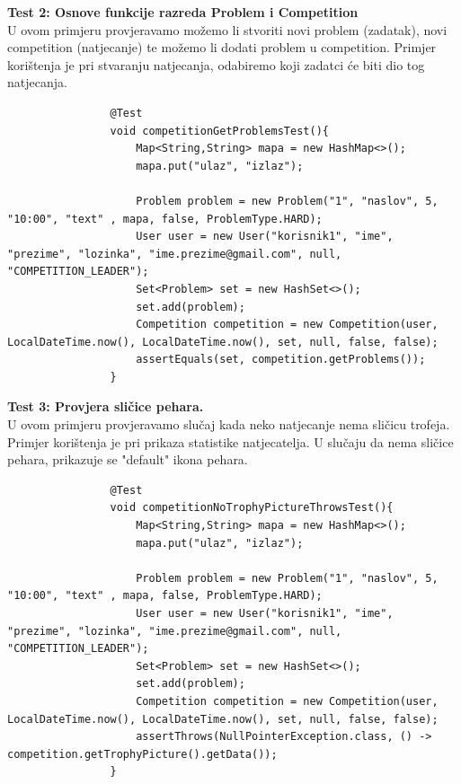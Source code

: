 			\textbf{Test 2: Osnove funkcije razreda Problem i Competition}\\
			U ovom primjeru provjeravamo možemo li stvoriti novi problem (zadatak), novi competition (natjecanje) te možemo li dodati problem u competition. Primjer korištenja je pri stvaranju natjecanja, odabiremo koji zadatci će biti dio tog natjecanja.
			\begin{lstlisting}
				@Test
				void competitionGetProblemsTest(){
					Map<String,String> mapa = new HashMap<>();
					mapa.put("ulaz", "izlaz");
					
					Problem problem = new Problem("1", "naslov", 5, "10:00", "text" , mapa, false, ProblemType.HARD);
					User user = new User("korisnik1", "ime", "prezime", "lozinka", "ime.prezime@gmail.com", null, "COMPETITION_LEADER");
					Set<Problem> set = new HashSet<>();
					set.add(problem);
					Competition competition = new Competition(user, LocalDateTime.now(), LocalDateTime.now(), set, null, false, false);
					assertEquals(set, competition.getProblems());
				}
			\end{lstlisting}
			
			\textbf{Test 3: Provjera sličice pehara.}\\
			U ovom primjeru provjeravamo slučaj kada neko natjecanje nema sličicu trofeja. Primjer korištenja je pri prikaza statistike natjecatelja. U slučaju da nema sličice pehara, prikazuje se "default" ikona pehara.
			\begin{lstlisting}
				@Test
				void competitionNoTrophyPictureThrowsTest(){
					Map<String,String> mapa = new HashMap<>();
					mapa.put("ulaz", "izlaz");
					
					Problem problem = new Problem("1", "naslov", 5, "10:00", "text" , mapa, false, ProblemType.HARD);
					User user = new User("korisnik1", "ime", "prezime", "lozinka", "ime.prezime@gmail.com", null, "COMPETITION_LEADER");
					Set<Problem> set = new HashSet<>();
					set.add(problem);
					Competition competition = new Competition(user, LocalDateTime.now(), LocalDateTime.now(), set, null, false, false);
					assertThrows(NullPointerException.class, () ->  competition.getTrophyPicture().getData());
				}
			\end{lstlisting}
			
